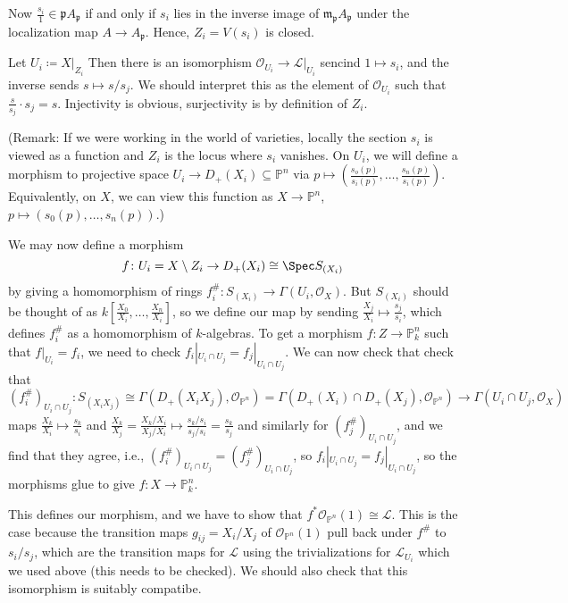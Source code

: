 Now $\frac{s_i}{1} \in \mathfrak{p}A_{\mathfrak{p}}$ if and only if $s_i$ lies in the
inverse image of $\mathfrak{m}_{\mathfrak{p}} A_{\mathfrak{p}}$ under the localization
map $A\to A_{\mathfrak{p}}$. Hence, $Z_i = V(s_i)$ is closed.

Let $U_i\coloneqq X|_{Z_i}$ Then there is an isomorphism $\mathcal{O}_{U_i} \to \mathcal{L}|_{U_i}$
sencind $1\mapsto s_i$, and the inverse sends $s\mapsto s/s_j$. We should interpret this
as the element of $\mathcal{O}_{U_i}$ such that $\frac{s}{s_j}\cdot s_j = s$. Injectivity is obvious,
surjectivity is by definition of $Z_i$.

(Remark: If we were working in the world of varieties, locally the section $s_i$ is
viewed as a function and $Z_i$ is the locus where $s_i$ vanishes. On $U_i$, we will
define a morphism to projective space $U_i\to D_+(X_i) \subseteq \mathbb{P}^n$
via $p\mapsto (\frac{s_o(p)}{s_i(p)}, \ldots, \frac{s_n(p)}{s_i(p)})$. Equivalently,
on $X$, we can view this function as $X\to \mathbb{P}^n$, $p\mapsto (s_0(p), \ldots, s_n(p))$.)

We may now define a morphism
\[ f\colon U_i = X\setminus Z_i \to D_+(X_i) \cong \Spec S_{(X_i)} \]
by giving a homomorphism of rings $f_i^\#\colon S_{(X_i)}\to \Gamma(U_i, \mathcal{O}_X)$. But
$S_{(X_i)}$ should be thought of as $k[\frac{X_0}{X_i},  \ldots, \frac{X_n}{X_i}]$,
so we define our map by sending $\frac{X_j}{X_i}\mapsto \frac{s_j}{s_i}$, which
defines $f_i^\#$ as a homomorphism of $k$-algebras.
To get a morphism $f\colon Z\to \mathbb{P}_k^n$ such that $f|_{U_i} = f_i$, we
need to check $f_i|_{U_i\cap U_j} = f_j|_{U_i\cap U_j}$. We can now check that check that
\[ (f_i^\#)_{U_i\cap U_j} \colon S_{(X_iX_j)} \cong \Gamma(D_+(X_iX_j),  \mathcal{O}_{\mathbb{P}^n}) = \Gamma(D_+(X_i)\cap D_+(X_j), \mathcal{O}_{\mathbb{P}^n})\to \Gamma(U_i\cap U_j, \mathcal{O}_X) \]
maps $\frac{X_k}{X_i}\mapsto \frac{s_k}{s_i}$ and $\frac{X_k}{X_j} = \frac{X_k/X_i}{X_j/X_i} \mapsto \frac{s_k/s_i}{s_j/s_i} = \frac{s_k}{s_j}$
and similarly for $(f_j^\#)_{U_i\cap U_j}$, and we find that they agree, i.e.,
$(f_i^\#)_{U_i\cap U_j} = (f_j^\#)_{U_i\cap U_j}$, so $f_i|_{U_i\cap U_j} = f_j|_{U_i\cap U_j}$,
so the morphisms glue to give $f\colon X\to \mathbb{P}^n_k$.

This defines our morphism, and we have to show that $f^*\mathcal{O}_{\mathbb{P}^n}(1)\cong \mathcal{L}$.
This is the case because the transition maps $g_{ij} = X_i/X_j$ of $\mathcal{O}_{\mathbb{P}^n}(1)$
pull back under $f^\#$ to $s_i/s_j$, which are the transition maps for $\mathcal{L}$
using the trivializations for $\mathcal{L}_{U_i}$ which we used above (this needs to be checked).
We should also check that this isomorphism is suitably compatibe.

